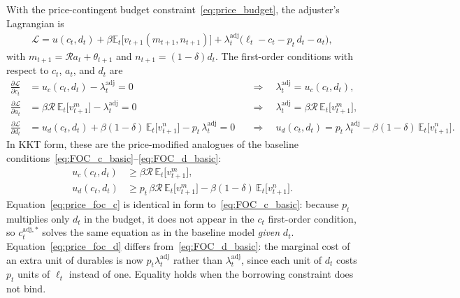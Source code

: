 With the price-contingent budget constraint~\eqref{eq:price_budget}, the adjuster's Lagrangian is
\begin{align}
	\mathscr{L} = u(c_t,d_t) + \beta \mathbb{E}_t\big[v_{t+1}(m_{t+1},n_{t+1})\big] + \lambda_t^{\mathrm{adj}}\big(\ell_t - c_t - p_t\, d_t - a_t\big),
\end{align}
with $m_{t+1}=\mathcal{R}a_t+\theta_{t+1}$ and $n_{t+1}=(1-\delta)d_t$. The first-order conditions with respect to $c_t$, $a_t$, and $d_t$ are
\begin{align}
	\frac{\partial \mathscr{L}}{\partial c_t} &= u_c(c_t,d_t) - \lambda_t^{\mathrm{adj}} = 0
	&&\Longrightarrow\quad \lambda_t^{\mathrm{adj}} = u_c(c_t,d_t), \label{eq:price_foc_c}\\
	\frac{\partial \mathscr{L}}{\partial a_t} &= \beta \mathcal{R}\, \mathbb{E}_t\big[v_{t+1}^m\big] - \lambda_t^{\mathrm{adj}} = 0
	&&\Longrightarrow\quad \lambda_t^{\mathrm{adj}} = \beta \mathcal{R}\, \mathbb{E}_t\big[v_{t+1}^m\big], \label{eq:price_foc_a}\\
	\frac{\partial \mathscr{L}}{\partial d_t} &= u_d(c_t,d_t) + \beta(1-\delta)\,\mathbb{E}_t\big[v_{t+1}^n\big] - p_t\,\lambda_t^{\mathrm{adj}} = 0
	&&\Longrightarrow\quad u_d(c_t,d_t) = p_t\,\lambda_t^{\mathrm{adj}} - \beta(1-\delta)\,\mathbb{E}_t\big[v_{t+1}^n\big]. \label{eq:price_foc_d}
\end{align}
In KKT form, these are the price-modified analogues of the baseline conditions~\eqref{eq:FOC_c_basic}--\eqref{eq:FOC_d_basic}:
\begin{align}
	u_c(c_t, d_t) &\geq \beta \mathcal{R}\, \mathbb{E}_t \big[v_{t+1}^m\big], \\
	u_d(c_t, d_t) &\geq p_t\,\beta \mathcal{R}\, \mathbb{E}_t\big[v_{t+1}^m\big] - \beta (1 - \delta)\, \mathbb{E}_t\big[v_{t+1}^n\big].
\end{align}
Equation~\eqref{eq:price_foc_c} is identical in form to~\eqref{eq:FOC_c_basic}: because $p_t$ multiplies only $d_t$ in the budget, it does not appear in the $c_t$ first-order condition, so $c_t^{\mathrm{adj},\ast}$ solves the same equation as in the baseline model \emph{given} $d_t$. Equation~\eqref{eq:price_foc_d} differs from~\eqref{eq:FOC_d_basic}: the marginal cost of an extra unit of durables is now $p_t\lambda_t^{\mathrm{adj}}$ rather than $\lambda_t^{\mathrm{adj}}$, since each unit of $d_t$ costs $p_t$ units of $\ell_t$ instead of one. Equality holds when the borrowing constraint does not bind.

